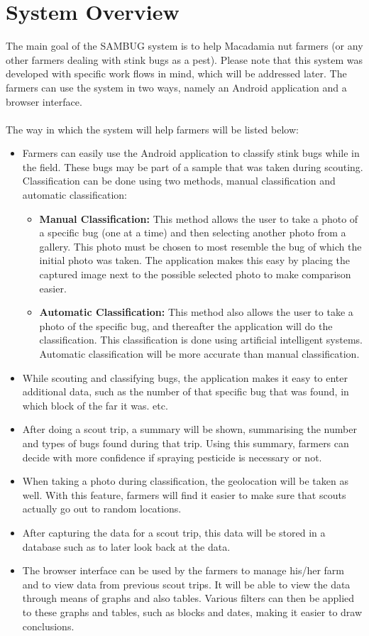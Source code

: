 \documentclass[11pt,a4paper,titlepage]{article}
\begin{document}
\section{System Overview}
The main goal of the SAMBUG system is to help Macadamia nut farmers (or any other farmers dealing with stink bugs as a pest). Please note that this system was developed with specific work flows in mind, which will be addressed later. 
The farmers can use the system in two ways, namely an Android application and a browser interface.\\\\
The way in which the system will help farmers will be listed below:
	\begin{itemize}
		\item Farmers can easily use the Android application to classify 			stink bugs while in the field. These bugs may be part of a sample 		that was taken during scouting. Classification can be done using 			two methods, manual classification and automatic classification:
		\begin{itemize}
			\item \textbf{Manual Classification:} This method allows the 				user to take a photo of a specific bug (one at a time) and 					then selecting another photo from a gallery. This photo must 				be chosen to most resemble the bug of which the initial photo 			was taken. The application makes this easy by placing the 					captured image next to the possible selected photo to make 					comparison easier.
			\item \textbf{Automatic Classification:} This method also 					allows the user to take a photo of the specific bug, and 					thereafter the application will do the classification. This 				classification is done using artificial intelligent systems. 				Automatic classification will be more accurate than manual 					classification. 
		\end{itemize}
		\item While scouting and classifying bugs, the application makes 
		it easy to enter additional data, such as the number of that 				specific bug that was found, in which block of the far it was. 				etc.
		\item After doing a scout trip, a summary will be shown, 					summarising the number and types of bugs found during that trip. 			Using this summary, farmers can decide with more confidence if 				spraying pesticide is necessary or not.
		\item When taking a photo during classification, the geolocation 			will be taken as well. With this feature, farmers will find it 				easier to make sure that scouts actually go out to random 					locations.
		\item After capturing the data for a scout trip, this data will 			be stored in a database such as to later look back at the data.
		\item The browser interface can be used by the farmers to manage 			his/her farm and to view data from previous scout trips. It will 			be able to view the data through means of graphs and also tables. 		Various filters can then be applied to these graphs and tables, 			such as blocks and dates, making it easier to draw conclusions.
	\end{itemize}
\end{document}
